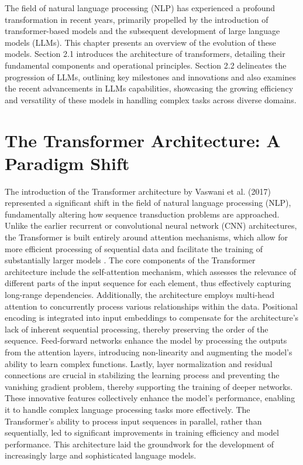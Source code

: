 \documentclass[logo,msc]{infthesis}           %
\begin{document}
The field of natural language processing (NLP) has experienced a profound transformation in recent years, primarily propelled by the introduction of transformer-based models and the subsequent development of large language models (LLMs). This chapter presents an overview of the evolution of these models. Section 2.1 introduces the architecture of transformers, detailing their fundamental components and operational principles. Section 2.2 delineates the progression of LLMs, outlining key milestones and innovations and also examines the recent advancements in LLMs capabilities, showcasing the growing efficiency and versatility of these models in handling complex tasks across diverse domains.


\section{The Transformer Architecture: A Paradigm Shift}
The introduction of the Transformer architecture by Vaswani et al. (2017) represented a significant shift in the field of natural language processing (NLP), fundamentally altering how sequence transduction problems are approached. Unlike the earlier recurrent or convolutional neural network (CNN) architectures, the Transformer is built entirely around attention mechanisms, which allow for more efficient processing of sequential data and facilitate the training of substantially larger models \cite{vaswani2023attentionneed}. The core components of the Transformer architecture include the self-attention mechanism, which assesses the relevance of different parts of the input sequence for each element, thus effectively capturing long-range dependencies. Additionally, the architecture employs multi-head attention to concurrently process various relationships within the data. Positional encoding is integrated into input embeddings to compensate for the architecture's lack of inherent sequential processing, thereby preserving the order of the sequence. Feed-forward networks enhance the model by processing the outputs from the attention layers, introducing non-linearity and augmenting the model’s ability to learn complex functions. Lastly, layer normalization and residual connections are crucial in stabilizing the learning process and preventing the vanishing gradient problem, thereby supporting the training of deeper networks. These innovative features collectively enhance the model's performance, enabling it to handle complex language processing tasks more effectively. The Transformer's ability to process input sequences in parallel, rather than sequentially, led to significant improvements in training efficiency and model performance. This architecture laid the groundwork for the development of increasingly large and sophisticated language models.
\end{document}
